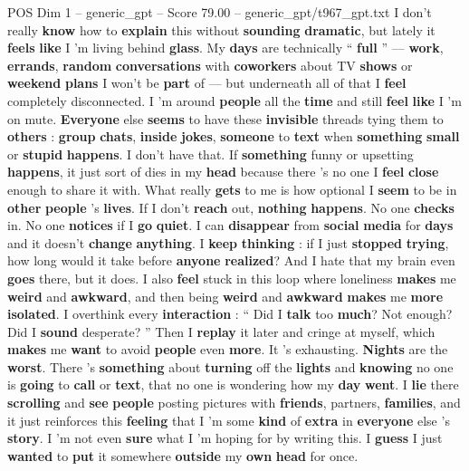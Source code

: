 \begin{textsample}{POS Dim 1 – generic\_gpt – Score 79.00 – generic\_gpt/t967\_gpt.txt}  \label{ex:f1_pos_017}
I don't really \textbf{know} how to \textbf{explain} this without \textbf{sounding} \textbf{dramatic}, but lately it \textbf{feels} \textbf{like} I ’m living behind \textbf{glass}.
My \textbf{days} are technically “ \textbf{full} ” — \textbf{work}, \textbf{errands}, \textbf{random} \textbf{conversations} with \textbf{coworkers} about TV \textbf{shows} or \textbf{weekend} \textbf{plans} I won't be \textbf{part} of — but underneath all of that I \textbf{feel} completely disconnected.
I ’m around \textbf{people} all the \textbf{time} and still \textbf{feel} \textbf{like} I ’m on mute. \textbf{Everyone} else \textbf{seems} to have these \textbf{invisible} threads tying them to \textbf{others} : \textbf{group} \textbf{chats}, \textbf{inside} \textbf{jokes}, \textbf{someone} to \textbf{text} when \textbf{something} \textbf{small} or \textbf{stupid} \textbf{happens}.
I don't have that.
If \textbf{something} funny or upsetting \textbf{happens}, it just sort of dies in my \textbf{head} because there ’s no one I \textbf{feel} \textbf{close} enough to share it with.
What really \textbf{gets} to me is how optional I \textbf{seem} to be in \textbf{other} \textbf{people} ’s \textbf{lives}.
If I don't \textbf{reach} out, \textbf{nothing} \textbf{happens}.
No one \textbf{checks} in.
No one \textbf{notices} if I \textbf{go} \textbf{quiet}.
I can \textbf{disappear} from \textbf{social} \textbf{media} for \textbf{days} and it doesn't \textbf{change} \textbf{anything}.
I \textbf{keep} \textbf{thinking} : if I just \textbf{stopped} \textbf{trying}, how long would it take before \textbf{anyone} \textbf{realized}?
And I hate that my brain even \textbf{goes} there, but it does.
I also \textbf{feel} stuck in this loop where loneliness \textbf{makes} me \textbf{weird} and \textbf{awkward}, and then being \textbf{weird} and \textbf{awkward} \textbf{makes} me \textbf{more} \textbf{isolated}.
I overthink every \textbf{interaction} : “ Did I \textbf{talk} too \textbf{much}?
Not enough?
Did I \textbf{sound} desperate? ” Then I \textbf{replay} it later and cringe at myself, which \textbf{makes} me \textbf{want} to avoid \textbf{people} even \textbf{more}.
It ’s exhausting. \textbf{Nights} are the \textbf{worst}.
There ’s \textbf{something} about \textbf{turning} off the \textbf{lights} and \textbf{knowing} no one is \textbf{going} to \textbf{call} or \textbf{text}, that no one is wondering how my \textbf{day} \textbf{went}.
I \textbf{lie} there \textbf{scrolling} and \textbf{see} \textbf{people} posting pictures with \textbf{friends}, partners, \textbf{families}, and it just reinforces this \textbf{feeling} that I ’m some \textbf{kind} of \textbf{extra} in \textbf{everyone} else ’s \textbf{story}.
I ’m not even \textbf{sure} what I ’m hoping for by writing this.
I \textbf{guess} I just \textbf{wanted} to \textbf{put} it somewhere \textbf{outside} my \textbf{own} \textbf{head} for once.


\end{textsample}
